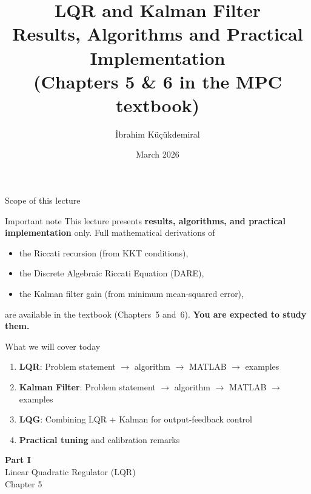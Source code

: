 \documentclass[aspectratio=169,11pt]{beamer}
\title[LQR \& Kalman Filter]{LQR and Kalman Filter\\[4pt]
\small Results, Algorithms and Practical Implementation\\[2pt]
\footnotesize (Chapters 5 \& 6 in the MPC textbook)}
\author{\tiny {\.{I}brahim K\"{u}\c{c}\"{u}kdemiral}}
\date{\small March 2026}
\begin{document}
\begin{frame}
  \titlepage
\end{frame}

\begin{frame}[shrink=3]{Scope of this lecture}
\begin{alertblock}{Important note}
This lecture presents \textbf{results, algorithms, and practical implementation} only.
Full mathematical derivations of
\begin{itemize}
  \item the Riccati recursion (from KKT conditions),
  \item the Discrete Algebraic Riccati Equation (DARE),
  \item the Kalman filter gain (from minimum mean-squared error),
\end{itemize}
are available in the textbook (Chapters~5 and~6). \textbf{You are expected to study them.}
\end{alertblock}

\begin{block}{What we will cover today}
\begin{enumerate}
  \item \textbf{LQR}: Problem statement $\to$ algorithm $\to$ MATLAB $\to$ examples
  \item \textbf{Kalman Filter}: Problem statement $\to$ algorithm $\to$ MATLAB $\to$ examples
  \item \textbf{LQG}: Combining LQR + Kalman for output-feedback control
  \item \textbf{Practical tuning} and calibration remarks
\end{enumerate}
\end{block}
\end{frame}


\begin{frame}{}
\centering
\vfill
{\Huge\bfseries Part I}\\[12pt]
{\Large Linear Quadratic Regulator (LQR)}\\[6pt]
{\normalsize Chapter 5}
\vfill
\end{frame}
\end{document}
